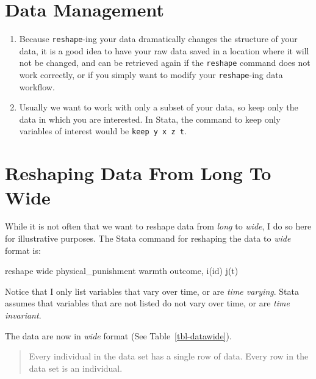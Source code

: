 \documentclass[
  letterpaper,
  DIV=11,
  numbers=noendperiod]{scrreprt}
\newenvironment{Shaded}{\begin{snugshade}}{\end{snugshade}}
\newcommand{\KeywordTok}[1]{\textcolor[rgb]{0.00,0.23,0.31}{#1}}
\newcommand{\NormalTok}[1]{\textcolor[rgb]{0.00,0.23,0.31}{#1}}
\providecommand{\tightlist}{%
  \setlength{\itemsep}{0pt}\setlength{\parskip}{0pt}}\usepackage{longtable,booktabs,array}
\begin{document}
\section{Data Management}\label{data-management}

\begin{enumerate}
\def\labelenumi{\arabic{enumi}.}
\tightlist
\item
  Because \texttt{reshape}-ing your data dramatically changes the
  structure of your data, it is a good idea to have your raw data saved
  in a location where it will not be changed, and can be retrieved again
  if the \texttt{reshape} command does not work correctly, or if you
  simply want to modify your \texttt{reshape}-ing data workflow.
\item
  Usually we want to work with only a subset of your data, so keep only
  the data in which you are interested. In Stata, the command to keep
  only variables of interest would be \texttt{keep\ y\ x\ z\ t}.
\end{enumerate}

\section{Reshaping Data From Long To
Wide}\label{reshaping-data-from-long-to-wide}

While it is not often that we want to reshape data from \emph{long} to
\emph{wide}, I do so here for illustrative purposes. The Stata command
for reshaping the data to \emph{wide} format is:

\begin{Shaded}
\begin{Highlighting}[]

\KeywordTok{reshape} \KeywordTok{wide}\NormalTok{ physical\_punishment warmth outcome, i(id) j(t)}
\end{Highlighting}
\end{Shaded}

Notice that I only list variables that vary over time, or are \emph{time
varying}. Stata assumes that variables that are not listed do not vary
over time, or are \emph{time invariant}.

The data are now in \emph{wide} format (See Table~\ref{tbl-datawide}).

\begin{quote}
Every individual in the data set has a single row of data. Every row in
the data set is an individual.
\end{quote}
\end{document}
